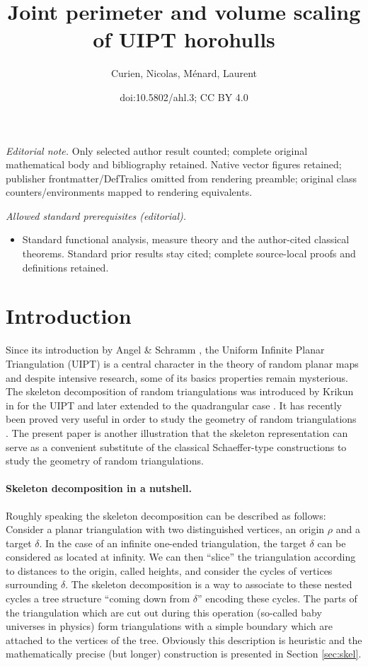 \documentclass[10pt]{amsart}
\title{Joint perimeter and volume scaling of UIPT horohulls}
\author{Curien, Nicolas, Ménard, Laurent}
\date{doi:10.5802/ahl.3; CC BY 4.0}
\theoremstyle{definition}\newtheorem{defi}[theo]{Definition}\newtheorem{rema}[theo]{Remark}\newtheorem{exam}[theo]{Example}\newtheorem{exem}[theo]{Example}\newtheorem{nota}[theo]{Notation}
\begin{document}
\maketitle
\noindent\textit{Editorial note.} Only selected author result counted; complete original mathematical body and bibliography retained. Native vector figures retained; publisher frontmatter/DefTralics omitted from rendering preamble; original class counters/environments mapped to rendering equivalents.\par\medskip
\noindent\textit{Allowed standard prerequisites (editorial).}\begin{itemize}
\item Standard functional analysis, measure theory and the author-cited classical theorems. Standard prior results stay cited; complete source-local proofs and definitions retained.
\end{itemize}\medskip
\section{Introduction}
Since its introduction by Angel \& Schramm \cite{AS}, the Uniform Infinite Planar Triangulation (UIPT) is a central character in the theory of random planar maps and despite intensive research, some of its basics properties remain mysterious. The skeleton decomposition of random triangulations was introduced by Krikun in \cite{Kr} for the UIPT and later extended to the quadrangular case \cite{Kr,LGL17}. It has recently been proved very useful in order to study the geometry of random triangulations  \cite{CLGfpp,AR,LGL17,Budzinski18,M}. The present paper is another illustration that the skeleton representation can serve as a convenient substitute of the classical Schaeffer-type constructions to study the geometry of random triangulations.

\paragraph{Skeleton decomposition in a nutshell.} Roughly speaking the skeleton decomposition can be described as follows: Consider a planar triangulation with two distinguished vertices, an origin $\rho$ and a target $\delta$. In the case of an infinite one-ended triangulation, the target $\delta$ can be considered as located at infinity. We can then ``slice'' the triangulation according to distances to the origin, called heights, and consider the cycles of vertices surrounding $\delta$. The skeleton decomposition is a way to associate to these nested cycles a tree structure ``coming down from $\delta$'' encoding these cycles. The parts of the triangulation which are cut out during this operation (so-called baby universes in physics) form triangulations with a simple boundary  which are attached to the vertices of the tree. Obviously this description is heuristic  and the mathematically precise (but longer) construction is presented in Section \ref{sec:skel}.
\end{document}
